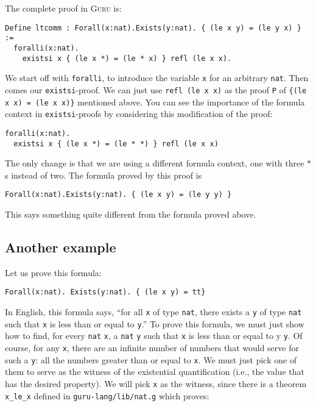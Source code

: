 \documentclass{book}[12pt]
\newcommand{\guru}[0]{\textsc{Guru}\xspace}
\begin{document}
\noindent The complete proof in \guru is:

\begin{verbatim}
Define ltcomm : Forall(x:nat).Exists(y:nat). { (le x y) = (le y x) } :=
  foralli(x:nat).
    existsi x { (le x *) = (le * x) } refl (le x x).
\end{verbatim}

\noindent We start off with \texttt{foralli}, to introduce the
variable \texttt{x} for an arbitrary \texttt{nat}.  Then comes our
\texttt{existsi}-proof.  We can just use \texttt{refl (le x x)} as the
proof \texttt{P} of \texttt{\{(le x x) = (le x x)\}} mentioned above.
You can see the importance of the formula context in
\texttt{existsi}-proofs by considering this modification of the proof:

\begin{verbatim}
foralli(x:nat).
  existsi x { (le x *) = (le * *) } refl (le x x)
\end{verbatim}

\noindent The only change is that we are using a different formula
context, one with three $*$s instead of two.  The formula proved by
this proof is

\begin{verbatim}
Forall(x:nat).Exists(y:nat). { (le x y) = (le y y) }
\end{verbatim}

\noindent This says something quite different from the formula proved
above.

\subsection{Another example}
\label{ch5:existsi2}

Let us prove this formula:

\begin{verbatim}
Forall(x:nat). Exists(y:nat). { (le x y) = tt}
\end{verbatim}

\noindent In English, this formula says, ``for all \texttt{x} of type
\texttt{nat}, there exists a \texttt{y} of type \texttt{nat} such that
\texttt{x} is less than or equal to \texttt{y}.''  To prove this
formula, we must just show how to find, for every \texttt{nat}
\texttt{x}, a \texttt{nat} \texttt{y} such that \texttt{x} is less
than or equal to y \texttt{y}.  Of course, for any \texttt{x}, there
are an infinite number of numbers that would serve for such a
\texttt{y}: all the numbers greater than or equal to \texttt{x}.  We
must just pick one of them to serve as the witness of the existential
quantification (i.e., the value that has the desired property).  We
will pick \texttt{x} as the witness, since there is a theorem
\texttt{x\_le\_x} defined in \texttt{guru-lang/lib/nat.g} which
proves:
\end{document}
